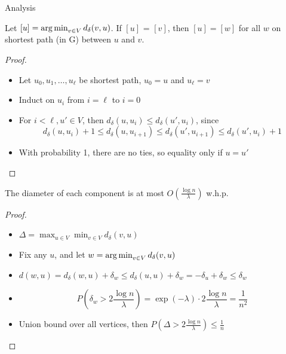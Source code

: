 \documentclass[aspectratio=169]{beamer}
\begin{document}
\begin{frame}[allowframebreaks]{Analysis}
    \begin{lemma}
        Let $[u] = \argmin_{v \in V} d_\delta(v, u)$.
        If $[u]$ = $[v]$, then $[u] = [w]$ for all $w$ on shortest path (in G) between $u$ and $v$.
    \end{lemma}

    \begin{proof}
        \begin{itemize}
            \item Let $u_0, u_1, \ldots, u_\ell$ be shortest path, $u_0 = u$ and $u_\ell = v$
            \item Induct on $u_i$ from $i=\ell$ to $i=0$
            \item For $i < \ell, u' \in V$, then $d_\delta(u, u_i) \le d_\delta(u', u_i)$, since
                  $$
                      d_\delta(u, u_i) + 1 \le d_\delta(u, u_{i+1})\le d_\delta(u', u_{i+1}) \le d_\delta(u', u_i) + 1
                  $$
            \item With probability 1, there are no ties, so equality only if $u = u'$
        \end{itemize}
    \end{proof}

    \begin{lemma}
        The diameter of each component is at most $O(\frac{\log n}{\lambda})$ w.h.p.
    \end{lemma}

    \begin{proof}
        \begin{itemize}
            \item $\Delta = \max_{u \in V} \min_{v \in V} d_\delta(v, u)$
            \item Fix any $u$, and let $w = \argmin_{v \in V} d_\delta(v, u)$
            \item $d(w, u) = d_\delta(w, u) + \delta_{w} \le d_\delta(u, u) + \delta_{w} = - \delta_{u} + \delta_{w} \le \delta_{w}$
            \item $$
                      P(\delta_w > 2 \frac{\log n}{\lambda}) = \exp{(- \lambda) \cdot 2 \frac{\log n}{\lambda}} = \frac{1}{n^2}
                  $$
            \item Union bound over all vertices, then $P(\Delta > 2 \frac{\log n}{\lambda}) \le \frac{1}{n}$
        \end{itemize}
    \end{proof}


\end{frame}
\end{document}
